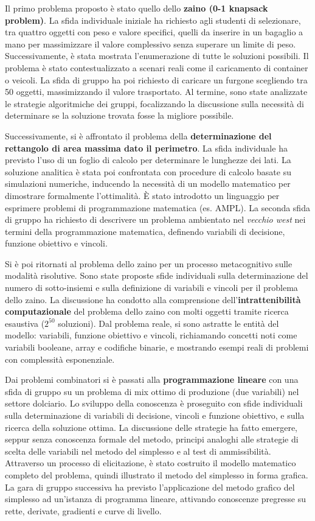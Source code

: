 \documentclass[withtimes]{easychair}
\begin{document}
Il primo problema proposto è stato quello dello \textbf{zaino (0-1
knapsack problem)}. La sfida individuale iniziale ha richiesto agli
studenti di selezionare, tra quattro oggetti con peso e valore
specifici, quelli da inserire in un bagaglio a mano per massimizzare il
valore complessivo senza superare un limite di peso. Successivamente, è
stata mostrata l'enumerazione di tutte le soluzioni possibili. Il
problema è stato contestualizzato a scenari reali come il caricamento di
container o veicoli. La sfida di gruppo ha poi richiesto di caricare un
furgone scegliendo tra 50 oggetti, massimizzando il valore trasportato.
Al termine, sono state analizzate le strategie algoritmiche dei gruppi,
focalizzando la discussione sulla necessità di determinare se la
soluzione trovata fosse la migliore possibile.

Successivamente, si è affrontato il problema della
\textbf{determinazione del rettangolo di area massima dato il
perimetro}. La sfida individuale ha previsto l'uso di un foglio di
calcolo per determinare le lunghezze dei lati. La soluzione analitica è
stata poi confrontata con procedure di calcolo basate su simulazioni
numeriche, inducendo la necessità di un modello matematico per
dimostrare formalmente l'ottimalità. È stato introdotto un linguaggio
per esprimere problemi di programmazione matematica (es. AMPL). La
seconda sfida di gruppo ha richiesto di descrivere un problema
ambientato nel \emph{vecchio west} nei termini della programmazione
matematica, definendo variabili di decisione, funzione obiettivo e
vincoli.

Si è poi ritornati al problema dello zaino per un processo metacognitivo
sulle modalità risolutive. Sono state proposte sfide individuali sulla
determinazione del numero di sotto-insiemi e sulla definizione di
variabili e vincoli per il problema dello zaino. La discussione ha
condotto alla comprensione dell'\textbf{intrattenibilità computazionale}
del problema dello zaino con molti oggetti tramite ricerca esaustiva
(\(2^{50}\) soluzioni). Dal problema reale, si sono astratte le entità
del modello: variabili, funzione obiettivo e vincoli, richiamando
concetti noti come variabili booleane, array e codifiche binarie, e
mostrando esempi reali di problemi con complessità esponenziale.

Dai problemi combinatori si è passati alla \textbf{programmazione
lineare} con una sfida di gruppo su un problema di mix ottimo di
produzione (due variabili) nel settore dolciario. Lo sviluppo della
conoscenza è proseguito con sfide individuali sulla determinazione di
variabili di decisione, vincoli e funzione obiettivo, e sulla ricerca
della soluzione ottima. La discussione delle strategie ha fatto
emergere, seppur senza conoscenza formale del metodo, principi analoghi
alle strategie di scelta delle variabili nel metodo del simplesso e al
test di ammissibilità. Attraverso un processo di elicitazione, è stato
costruito il modello matematico completo del problema, quindi illustrato
il metodo del simplesso in forma grafica. La gara di gruppo successiva
ha previsto l'applicazione del metodo grafico del simplesso ad
un'istanza di programma lineare, attivando conoscenze pregresse su
rette, derivate, gradienti e curve di livello.
\end{document}
